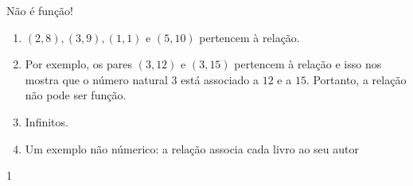 \begin{answer}{Não é função!}
{
\begin{enumerate}
\item {} 
$(2,8),(3,9), (1,1)$ e $(5,10)$ pertencem à relação.

\item {} 
Por exemplo, os pares $(3,12)$ e $(3,15)$ pertencem à relação e isso nos mostra que o número natural $3$ está associado a $12$ e a $15$. Portanto, a relação não pode ser função.

\item {} 
Infinitos.

\item {} 
Um exemplo não númerico: a relação associa cada livro ao seu autor

\end{enumerate}
}{1}
\end{answer}

